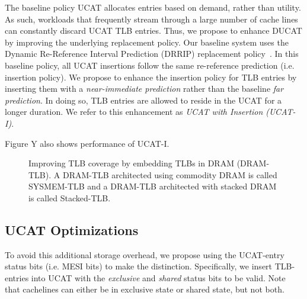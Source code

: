 The baseline policy UCAT allocates entries based on demand, rather than
utility. As such, workloads that frequently stream through a large
number of cache lines can constantly discard UCAT TLB entries. Thus,
we propose to enhance DUCAT by improving the underlying replacement
policy. Our baseline system uses the Dynamic Re-Reference Interval
Prediction (DRRIP) replacement policy~\cite{}. In this baseline
policy, all UCAT insertions follow the same re-reference prediction
(i.e. insertion policy). We propose to enhance the insertion policy
for TLB entries by inserting them with a {\em near-immediate
prediction} rather than the baseline {\em far prediction}. In doing
so, TLB entries are allowed to reside in the UCAT for a longer
duration. We refer to this enhancement as {\em UCAT with Insertion
(UCAT-I)}.

Figure Y also shows performance of UCAT-I.

\begin{figure*}[t] 
  \vspace{-0. in} \centering
   \centerline{}

  \caption{\small Improving TLB coverage by embedding TLBs in DRAM
    (DRAM-TLB). A DRAM-TLB architected using commodity DRAM is called
    SYSMEM-TLB and a DRAM-TLB architected with stacked DRAM is called
    Stacked-TLB. \normalsize}
  \label{fig:stacked_tlb} 
  \vspace{-0. in}
\end{figure*}

\subsection{UCAT Optimizations}

To avoid this additional storage overhead, we propose using the
UCAT-entry status bits (i.e. MESI bits) to make the distinction.
Specifically, we insert TLB-entries into UCAT with the {\em exclusive}
and {\em shared} status bits to be valid. Note that cachelines can
either be in exclusive state or shared state, but not both.

